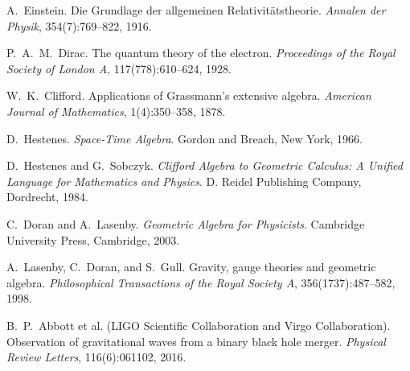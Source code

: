 \documentclass[11pt,a4paper]{article}
\numberwithin{equation}{section}
\theoremstyle{plain}
\theoremstyle{definition}
\theoremstyle{remark}
\begin{document}
\begin{thebibliography}{9}

A.~Einstein.
\newblock Die Grundlage der allgemeinen Relativitätstheorie.
\newblock \emph{Annalen der Physik}, 354(7):769--822, 1916.

P.~A.~M.~Dirac.
\newblock The quantum theory of the electron.
\newblock \emph{Proceedings of the Royal Society of London A}, 117(778):610--624, 1928.

W.~K.~Clifford.
\newblock Applications of Grassmann's extensive algebra.
\newblock \emph{American Journal of Mathematics}, 1(4):350--358, 1878.

D.~Hestenes.
\newblock \emph{Space-Time Algebra}.
\newblock Gordon and Breach, New York, 1966.

D.~Hestenes and G.~Sobczyk.
\newblock \emph{Clifford Algebra to Geometric Calculus: A Unified Language for Mathematics and Physics}.
\newblock D. Reidel Publishing Company, Dordrecht, 1984.

C.~Doran and A.~Lasenby.
\newblock \emph{Geometric Algebra for Physicists}.
\newblock Cambridge University Press, Cambridge, 2003.

A.~Lasenby, C.~Doran, and S.~Gull.
\newblock Gravity, gauge theories and geometric algebra.
\newblock \emph{Philosophical Transactions of the Royal Society A}, 356(1737):487--582, 1998.

B.~P.~Abbott et al. (LIGO Scientific Collaboration and Virgo Collaboration).
\newblock Observation of gravitational waves from a binary black hole merger.
\newblock \emph{Physical Review Letters}, 116(6):061102, 2016.

\end{thebibliography}
\end{document}
